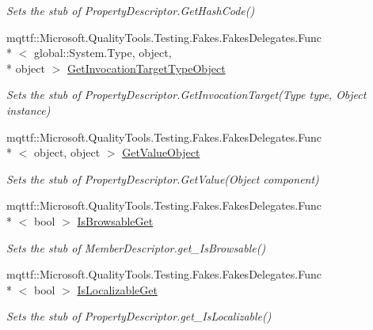 \begin{DoxyCompactItemize}
\begin{DoxyCompactList}\small\item\em Sets the stub of Property\-Descriptor.\-Get\-Hash\-Code()\end{DoxyCompactList}\item 
mqttf\-::\-Microsoft.\-Quality\-Tools.\-Testing.\-Fakes.\-Fakes\-Delegates.\-Func\\*
$<$ global\-::\-System.\-Type, object, \\*
object $>$ \hyperlink{class_system_1_1_component_model_1_1_fakes_1_1_stub_property_descriptor_abc451de22806cdd21fa1b1418875fd32}{Get\-Invocation\-Target\-Type\-Object}
\begin{DoxyCompactList}\small\item\em Sets the stub of Property\-Descriptor.\-Get\-Invocation\-Target(\-Type type, Object instance)\end{DoxyCompactList}\item 
mqttf\-::\-Microsoft.\-Quality\-Tools.\-Testing.\-Fakes.\-Fakes\-Delegates.\-Func\\*
$<$ object, object $>$ \hyperlink{class_system_1_1_component_model_1_1_fakes_1_1_stub_property_descriptor_ac9771fcf80b598eb0fbac9c479917c5b}{Get\-Value\-Object}
\begin{DoxyCompactList}\small\item\em Sets the stub of Property\-Descriptor.\-Get\-Value(\-Object component)\end{DoxyCompactList}\item 
mqttf\-::\-Microsoft.\-Quality\-Tools.\-Testing.\-Fakes.\-Fakes\-Delegates.\-Func\\*
$<$ bool $>$ \hyperlink{class_system_1_1_component_model_1_1_fakes_1_1_stub_property_descriptor_a7e4d6218927b619eedea68cc869c4aca}{Is\-Browsable\-Get}
\begin{DoxyCompactList}\small\item\em Sets the stub of Member\-Descriptor.\-get\-\_\-\-Is\-Browsable()\end{DoxyCompactList}\item 
mqttf\-::\-Microsoft.\-Quality\-Tools.\-Testing.\-Fakes.\-Fakes\-Delegates.\-Func\\*
$<$ bool $>$ \hyperlink{class_system_1_1_component_model_1_1_fakes_1_1_stub_property_descriptor_aa303d3b6ae5376d5a493ee6f5462c080}{Is\-Localizable\-Get}
\begin{DoxyCompactList}\small\item\em Sets the stub of Property\-Descriptor.\-get\-\_\-\-Is\-Localizable()\end{DoxyCompactList}\item 

\end{DoxyCompactItemize}
